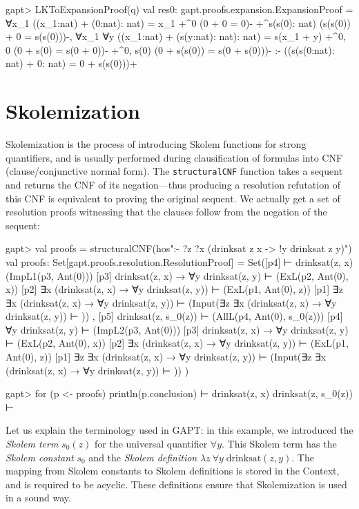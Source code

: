 \documentclass[a4paper,11pt]{book}
\begin{document}
\begin{clilisting}
gapt> LKToExpansionProof(q)
val res0: gapt.proofs.expansion.ExpansionProof =
∀x_1 ((x_1:nat) + (0:nat): nat) = x_1
  +^{0} (0 + 0 = 0)-
  +^{s(s(0): nat)} (s(s(0)) + 0 = s(s(0)))-,
∀x_1 ∀y ((x_1:nat) + (s(y:nat): nat): nat) = s(x_1 + y)
  +^{0, 0} (0 + s(0) = s(0 + 0))-
  +^{0, s(0)} (0 + s(s(0)) = s(0 + s(0)))-
:-
((s(s(0:nat): nat) + 0: nat) = 0 + s(s(0)))+

\end{clilisting}

\section{Skolemization}\label{secskolem}

Skolemization is the process of introducing Skolem functions for strong
quantifiers, and is usually performed during clausification of formulas into
CNF (clause/conjunctive normal form).  The \texttt{structuralCNF} function
takes a sequent and returns the CNF of its negation---thus producing a
resolution refutation of this CNF is equivalent to proving the original
sequent.  We actually get a set of resolution proofs witnessing that the
clauses follow from the negation of the sequent:
\begin{clilisting}
gapt> val proofs = structuralCNF(hos":- ?z ?x (drinksat z x -> !y drinksat z y)")
val proofs: Set[gapt.proofs.resolution.ResolutionProof] =
Set([p4]  ⊢ drinksat(z, x)   (ImpL1(p3, Ant(0)))
[p3] drinksat(z, x) → ∀y drinksat(z, y) ⊢    (ExL(p2, Ant(0), x))
[p2] ∃x (drinksat(z, x) → ∀y drinksat(z, y)) ⊢    (ExL(p1, Ant(0), z))
[p1] ∃z ∃x (drinksat(z, x) → ∀y drinksat(z, y)) ⊢    (Input(∃z ∃x (drinksat(z, x) → ∀y drinksat(z, y)) ⊢ ))
, [p5] drinksat(z, s_0(z)) ⊢    (AllL(p4, Ant(0), s_0(z)))
[p4] ∀y drinksat(z, y) ⊢    (ImpL2(p3, Ant(0)))
[p3] drinksat(z, x) → ∀y drinksat(z, y) ⊢    (ExL(p2, Ant(0), x))
[p2] ∃x (drinksat(z, x) → ∀y drinksat(z, y)) ⊢    (ExL(p1, Ant(0), z))
[p1] ∃z ∃x (drinksat(z, x) → ∀y drinksat(z, y)) ⊢    (Input(∃z ∃x (drinksat(z, x) → ∀y drinksat(z, y)) ⊢ ))
)

gapt> for (p <- proofs) println(p.conclusion)
 ⊢ drinksat(z, x)
drinksat(z, s_0(z)) ⊢ 

\end{clilisting}

Let us explain the terminology used in GAPT: in this example, we introduced
the \emph{Skolem term} $s_0(z)$ for the universal quantifier $\forall y$.  This
Skolem term has the \emph{Skolem constant} $s_0$ and the \emph{Skolem
definition} $\lambda z\: \forall y\; \mathrm{drinksat}(z,y)$.  The mapping from
Skolem constants to Skolem definitions is stored in the Context, and is
required to be acyclic.  These definitions ensure that Skolemization is used in
a sound way.
\end{document}
